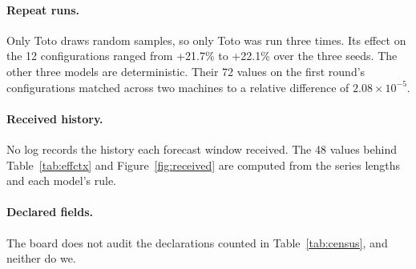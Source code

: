 \documentclass{article}
\begin{document}
\paragraph{Repeat runs.} Only Toto draws random samples, so only Toto was run three times. Its
effect on the 12 configurations ranged from +21.7\% to +22.1\% over the three seeds. The other
three models are deterministic. Their 72 values on the first round's configurations matched
across two machines to a relative difference of $2.08\times10^{-5}$.

\paragraph{Received history.} No log records the history each forecast window received. The 48
values behind Table~\ref{tab:effctx} and Figure~\ref{fig:received} are computed from the series
lengths and each model's rule.

\paragraph{Declared fields.} The board does not audit the declarations counted in
Table~\ref{tab:census}, and neither do we.
\end{document}
